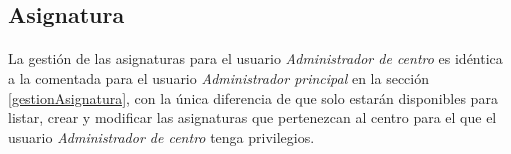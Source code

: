 \subsection{Asignatura}

  \paragraph{}La gestión de las asignaturas para el usuario
  \textit{Administrador de centro} es idéntica a la comentada para el usuario
  \textit{Administrador principal} en la sección \ref{gestionAsignatura}, con la
  única diferencia de que solo estarán disponibles para listar, crear y
  modificar las asignaturas que pertenezcan al centro para el que el usuario
  \textit{Administrador de centro} tenga privilegios.